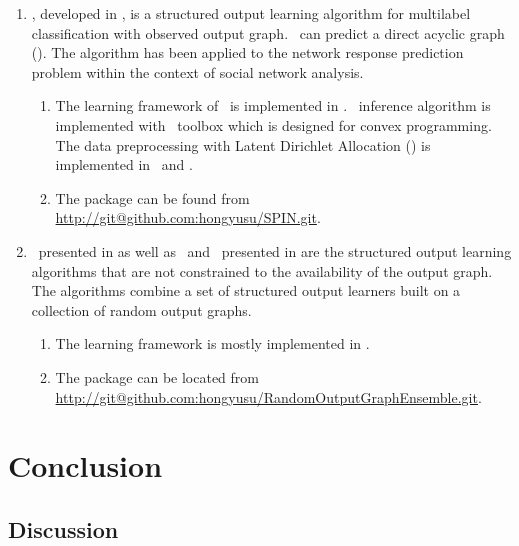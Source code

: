 {\begin{enumerate}
	\item \spin, developed in , is a structured output learning algorithm for multilabel classification with observed output graph. \spin\ can predict a direct acyclic graph (\daggraph). The algorithm has been applied to the network response prediction problem within the context of social network analysis.
	\begin{enumerate}
		\item The learning framework of \spin\ is implemented in \matlab. \sdp\ inference algorithm is implemented with \cvx\ toolbox which is designed for convex programming. The data preprocessing with Latent Dirichlet Allocation (\lda) \citep{Blei03latent} is implemented in \python\ and \matlab.
		\item The package can be found from \url{http://git@github.com:hongyusu/SPIN.git}.
	\end{enumerate}
	
	\item \mve\ presented in  as well as \amm\ and \mam\ presented in  are the structured output learning algorithms that are not constrained to the availability of the output graph. The algorithms combine a set of structured output learners built on a collection of random output graphs.
	\begin{enumerate}
		\item The learning framework is mostly implemented in \matlab.
		\item The package can be located from \url{http://git@github.com:hongyusu/RandomOutputGraphEnsemble.git}.
	\end{enumerate}
\end{enumerate}




%
%
\chapter{Conclusion} \label{ch_conclusion}


\section{Discussion}

}
